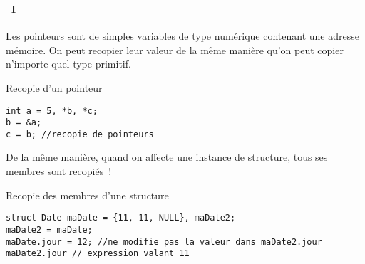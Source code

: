 \begin{frame}[containsverbatim]
  \frametitle{\secname}
  \framesubtitle{\subsecname~I}

  Les pointeurs sont de simples variables de type numérique contenant une adresse mémoire. On peut recopier leur valeur de la même manière
  qu'on peut copier n'importe quel type primitif.
  {\small\begin{exampleblock}{Recopie d'un pointeur}
    \begin{verbatim}
int a = 5, *b, *c;
b = &a;
c = b; //recopie de pointeurs\end{verbatim}
  \end{exampleblock}}
  \par
  De la même manière, quand on affecte une instance de structure, tous ses membres sont recopiés~!
  {\small\begin{exampleblock}{Recopie des membres d'une structure}
    \begin{verbatim}
struct Date maDate = {11, 11, NULL}, maDate2;
maDate2 = maDate;
maDate.jour = 12; //ne modifie pas la valeur dans maDate2.jour
maDate2.jour // expression valant 11\end{verbatim}
  \end{exampleblock}}
\end{frame}

